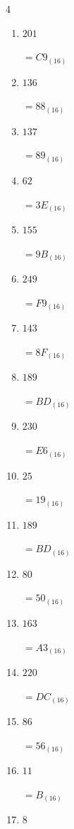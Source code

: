 \begin{multicols}{4}
\begin{enumerate}
  \item $201$

        $=C9_{(16)}$

  \item $136$

        $=88_{(16)}$

  \item $137$

        $=89_{(16)}$

  \item $62$

        $=3E_{(16)}$

  \item $155$

        $=9B_{(16)}$

  \item $249$

        $=F9_{(16)}$

  \item $143$

        $=8F_{(16)}$

  \item $189$

        $=BD_{(16)}$

\columnbreak %

  \item $230$

        $=E6_{(16)}$

  \item $25$

        $=19_{(16)}$

  \item $189$

        $=BD_{(16)}$

  \item $80$

        $=50_{(16)}$

  \item $163$

        $=A3_{(16)}$

  \item $220$

        $=DC_{(16)}$

  \item $86$

        $=56_{(16)}$

  \item $11$

        $=B_{(16)}$

  \item $8$


\end{enumerate}
\end{multicols}
